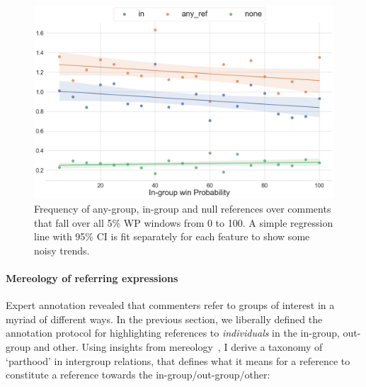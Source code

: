 \begin{figure}[t]
    \centering
    \includegraphics[width=\linewidth]{figures/test-trends.png}
    \caption{Frequency of any-group, in-group and null references over comments that fall over all 5\% WP windows from 0 to 100. A simple regression line with 95\% CI is fit separately for each feature to show some noisy trends.}
    \label{fig:test-trends}
\end{figure}

\paragraph{Mereology of referring expressions} Expert annotation revealed that commenters refer to groups of interest in a myriad of different ways. In the previous section, we liberally defined the annotation protocol for highlighting references to \emph{individuals} in the in-group, out-group and other. Using insights from mereology~\citep{sep-mereology}, I derive a taxonomy of `parthood' in intergroup relations, that defines what it means for a reference to constitute a reference towards the in-group/out-group/other:

